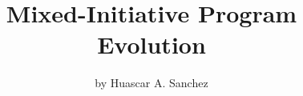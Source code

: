 \documentclass[fontsize=8pt]{memoir} %
\begin{document}
\title{Mixed-Initiative Program Evolution}
\author{by Huascar A. Sanchez}

\date{}
\maketitle
\newpage









\todos


\end{document}
